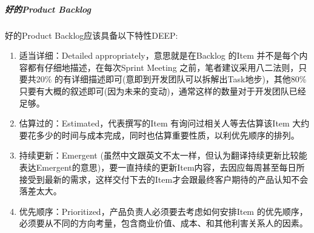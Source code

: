 \documentclass[letterpaper,10pt,english]{sphinxmanual}
\begin{document}
\subparagraph{好的Product Backlog}
\label{\detokenize{chapter_project/Scrum:product-backlog}}
好的Product Backlog应该具备以下特性DEEP:
%
\begin{footnote}[816]\sphinxAtStartFootnote
{}
%
\end{footnote}
\begin{enumerate}
%
\item {} 
适当详细：Detailed appropriately，意思就是在Backlog 的Item
并不是每个内容都有仔细地描述，在每次Sprint Meeting
之前，笔者建议采用八二法则，只要共20\%
的有详细描述即可(意即到开发团队可以拆解出Task地步)，其他80\%
只要有大概的叙述即可(因为未来的变动)，通常这样的数量对于开发团队已经足够。

\item {} 
估算过的：Estimated，代表撰写的Item 有询问过相关人等去估算该Item
大约要花多少的时间与成本完成，同时也估算重要性质，以利优先顺序的排列。

\item {} 
持续更新：Emergent
(虽然中文跟英文不太一样，但认为翻译持续更新比较能表达Emergent的意思)，要一直持续的更新Item内容，去因应每周甚至每日所接受到最新的需求，这样交付下去的Item才会跟最终客户期待的产品认知不会落差太大。

\item {} 
优先顺序：Prioritized，产品负责人必须要去考虑如何安排Item
的优先顺序，必须要从不同的方向考量，包含商业价值、成本、和其他利害关系人的因素。

\end{enumerate}
\end{document}
